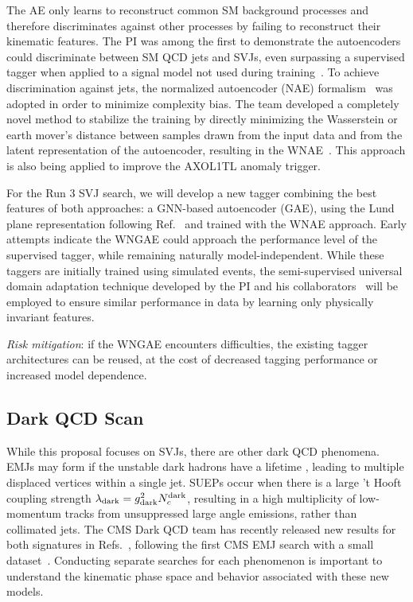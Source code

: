The AE only learns to reconstruct common SM background processes and therefore discriminates against other processes by failing to reconstruct their kinematic features.
The PI was among the first to demonstrate the autoencoders could discriminate between SM QCD jets and SVJs, even surpassing a supervised tagger when applied to a signal model not used during training~\cite{Canelli:2021aps}.
To achieve discrimination against \ttbar jets, the normalized autoencoder (NAE) formalism~\cite{Dillon:2022mkq} was adopted in order to minimize complexity bias.
The team developed a completely novel method to stabilize the training by directly minimizing the Wasserstein or earth mover's distance
between samples drawn from the input data and from the latent representation of the autoencoder, resulting in the WNAE~\cite{Eble:2024tpr}.
This approach is also being applied to improve the AXOL1TL anomaly trigger.

For the Run 3 SVJ search, we will develop a new tagger combining the best features of both approaches:
a GNN-based autoencoder (GAE), using the Lund plane representation following Ref.~\cite{Dreyer:2020brq} and trained with the WNAE approach.
Early attempts indicate the WNGAE could approach the performance level of the supervised tagger, while remaining naturally model-independent.
While these taggers are initially trained using simulated events,
the semi-supervised universal domain adaptation technique developed by the PI and his collaborators~\cite{Ciprijanovic:2023hrw}
will be employed to ensure similar performance in data by learning only physically invariant features.

\textit{Risk mitigation}: if the WNGAE encounters difficulties, the existing tagger architectures can be reused, at the cost of decreased tagging performance or increased model dependence.

\subsection{Dark QCD Scan}\label{subsec:darkscan}

While this proposal focuses on SVJs, there are other dark QCD phenomena.
EMJs may form if the unstable dark hadrons have a lifetime \taudark, leading to multiple displaced vertices within a single jet.
SUEPs occur when there is a large 't Hooft coupling strength $\lambda_\text{dark} = g_{\mathrm{dark}}^2 N_{c}^{\text{dark}}$,
resulting in a high multiplicity of low-momentum tracks from unsuppressed large angle emissions, rather than collimated jets.
The CMS Dark QCD team has recently released new results for both signatures in Refs.~\cite{CMS:2023vpb,CMS:2024emj},
following the first CMS EMJ search with a small dataset~\cite{Sirunyan:2018njd}.
Conducting separate searches for each phenomenon is important to understand the kinematic phase space and behavior associated with these new models.

